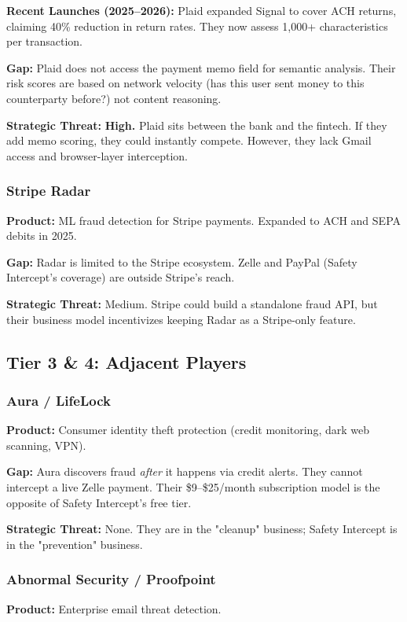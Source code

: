 \documentclass[12pt]{article}
\begin{document}
\textbf{Recent Launches (2025–2026):} Plaid expanded Signal to cover ACH returns, claiming 40\% reduction in return rates. They now assess 1,000+ characteristics per transaction.

\textbf{Gap:} Plaid does not access the payment memo field for semantic analysis. Their risk scores are based on network velocity (has this user sent money to this counterparty before?) not content reasoning.

\textbf{Strategic Threat:} \textbf{High.} Plaid sits between the bank and the fintech. If they add memo scoring, they could instantly compete. However, they lack Gmail access and browser-layer interception.

\subsubsection{Stripe Radar}
\textbf{Product:} ML fraud detection for Stripe payments. Expanded to ACH and SEPA debits in 2025.

\textbf{Gap:} Radar is limited to the Stripe ecosystem. Zelle and PayPal (Safety Intercept's coverage) are outside Stripe's reach.

\textbf{Strategic Threat:} Medium. Stripe could build a standalone fraud API, but their business model incentivizes keeping Radar as a Stripe-only feature.

\subsection{Tier 3 \& 4: Adjacent Players}

\subsubsection{Aura / LifeLock}
\textbf{Product:} Consumer identity theft protection (credit monitoring, dark web scanning, VPN).

\textbf{Gap:} Aura discovers fraud \textit{after} it happens via credit alerts. They cannot intercept a live Zelle payment. Their \$9–\$25/month subscription model is the opposite of Safety Intercept's free tier.

\textbf{Strategic Threat:} None. They are in the "cleanup" business; Safety Intercept is in the "prevention" business.

\subsubsection{Abnormal Security / Proofpoint}
\textbf{Product:} Enterprise email threat detection.
\end{document}
